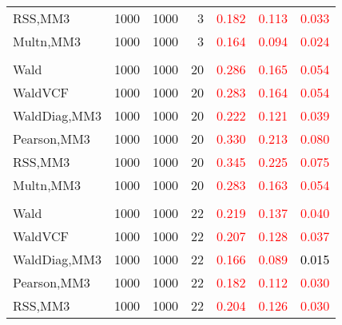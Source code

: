 \documentclass[
]{article}
\begin{document}
\begin{table}[H]
{\begin{tabular}[t]{lrrrrrr}
\hspace{1em}RSS,MM3 & 1000 & 1000 & 3 & \textcolor{red}{0.182} & \textcolor{red}{0.113} & \textcolor{red}{0.033}\\
\hspace{1em}Multn,MM3 & 1000 & 1000 & 3 & \textcolor{red}{0.164} & \textcolor{red}{0.094} & \textcolor{red}{0.024}\\
\addlinespace[0.3em]
\multicolumn{7}{l}{\textbf{1F 15V}}\\
\hspace{1em}Wald & 1000 & 1000 & 20 & \textcolor{red}{0.286} & \textcolor{red}{0.165} & \textcolor{red}{0.054}\\
\hspace{1em}WaldVCF & 1000 & 1000 & 20 & \textcolor{red}{0.283} & \textcolor{red}{0.164} & \textcolor{red}{0.054}\\
\hspace{1em}WaldDiag,MM3 & 1000 & 1000 & 20 & \textcolor{red}{0.222} & \textcolor{red}{0.121} & \textcolor{red}{0.039}\\
\hspace{1em}Pearson,MM3 & 1000 & 1000 & 20 & \textcolor{red}{0.330} & \textcolor{red}{0.213} & \textcolor{red}{0.080}\\
\hspace{1em}RSS,MM3 & 1000 & 1000 & 20 & \textcolor{red}{0.345} & \textcolor{red}{0.225} & \textcolor{red}{0.075}\\
\hspace{1em}Multn,MM3 & 1000 & 1000 & 20 & \textcolor{red}{0.283} & \textcolor{red}{0.163} & \textcolor{red}{0.054}\\
\addlinespace[0.3em]
\multicolumn{7}{l}{\textbf{2F 10V}}\\
\hspace{1em}Wald & 1000 & 1000 & 22 & \textcolor{red}{0.219} & \textcolor{red}{0.137} & \textcolor{red}{0.040}\\
\hspace{1em}WaldVCF & 1000 & 1000 & 22 & \textcolor{red}{0.207} & \textcolor{red}{0.128} & \textcolor{red}{0.037}\\
\hspace{1em}WaldDiag,MM3 & 1000 & 1000 & 22 & \textcolor{red}{0.166} & \textcolor{red}{0.089} & \textcolor{black}{0.015}\\
\hspace{1em}Pearson,MM3 & 1000 & 1000 & 22 & \textcolor{red}{0.182} & \textcolor{red}{0.112} & \textcolor{red}{0.030}\\
\hspace{1em}RSS,MM3 & 1000 & 1000 & 22 & \textcolor{red}{0.204} & \textcolor{red}{0.126} & \textcolor{red}{0.030}\\

\end{tabular}}
\end{table}
\end{document}
